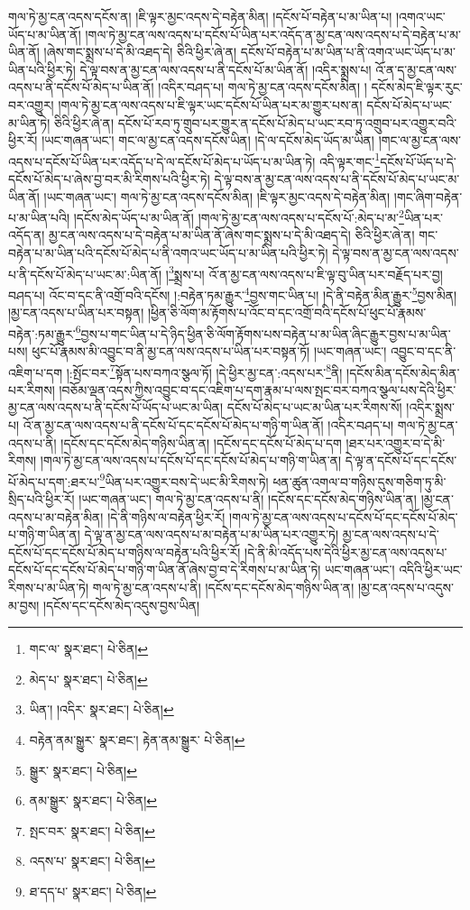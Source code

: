 གལ་ཏེ་མྱ་ངན་འདས་དངོས་ན། །ཇི་ལྟར་མྱང་འདས་དེ་བརྟེན་མིན། །དངོས་པོ་བརྟེན་པ་མ་ཡིན་པ། །འགའ་ཡང་ཡོད་པ་མ་ཡིན་ནོ། །གལ་ཏེ་མྱ་ངན་ལས་འདས་པ་དངོས་པོ་ཡིན་པར་འདོད་ན་མྱ་ངན་ལས་འདས་པ་དེ་བརྟེན་པ་མ་ཡིན་ནོ། །ཞེས་གང་སྨྲས་པ་དེ་མི་འཐད་དེ། ཅིའི་ཕྱིར་ཞེ་ན། དངོས་པོ་བརྟེན་པ་མ་ཡིན་པ་ནི་འགའ་ཡང་ཡོད་པ་མ་ཡིན་པའི་ཕྱིར་ཏེ། དེ་ལྟ་བས་ན་མྱ་ངན་ལས་འདས་པ་ནི་དངོས་པོ་མ་ཡིན་ནོ། །འདིར་སྨྲས་པ། འོ་ན་ད་མྱ་ངན་ལས་འདས་པ་ནི་དངོས་པོ་མེད་པ་ཡིན་ནོ། །འདིར་བཤད་པ། གལ་ཏེ་མྱ་ངན་འདས་དངོས་མིན། །
དངོས་མེད་ཇི་ལྟར་རུང་བར་འགྱུར། །གལ་ཏེ་མྱ་ངན་ལས་འདས་པ་ཇི་ལྟར་ཡང་དངོས་པོ་ཡིན་པར་མ་གྱུར་པས་ན། དངོས་པོ་མེད་པ་ཡང་མ་ཡིན་ཏེ། ཅིའི་ཕྱིར་ཞེ་ན། དངོས་པོ་རབ་ཏུ་གྲུབ་པར་གྱུར་ན་དངོས་པོ་མེད་པ་ཡང་རབ་ཏུ་འགྲུབ་པར་འགྱུར་བའི་ཕྱིར་རོ། །ཡང་གཞན་ཡང་། གང་ལ་མྱ་ངན་འདས་དངོས་ཡིན། །དེ་ལ་དངོས་མེད་ཡོད་མ་ཡིན། །གང་ལ་མྱ་ངན་ལས་འདས་པ་དངོས་པོ་ཡིན་པར་འདོད་པ་དེ་ལ་དངོས་པོ་མེད་པ་ཡོད་པ་མ་ཡིན་ཏེ། འདི་ལྟར་གང་\footnote{གང་ལ་  སྣར་ཐང་།  པེ་ཅིན། }དངོས་པོ་ཡོད་པ་དེ་དངོས་པོ་མེད་པ་ཞེས་བྱ་བར་མི་རིགས་པའི་ཕྱིར་ཏེ། དེ་ལྟ་བས་ན་མྱ་ངན་ལས་འདས་པ་ནི་དངོས་པོ་མེད་པ་ཡང་མ་ཡིན་ནོ། །ཡང་གཞན་ཡང་། གལ་ཏེ་མྱ་ངན་འདས་དངོས་མིན། །ཇི་ལྟར་མྱང་འདས་དེ་བརྟེན་མིན། །གང་ཞིག་བརྟེན་པ་མ་ཡིན་པའི། །དངོས་མེད་ཡོད་པ་མ་ཡིན་ནོ། །གལ་ཏེ་མྱ་ངན་ལས་འདས་པ་དངོས་པོ་:མེད་པ་མ་\footnote{མེད་པ་  སྣར་ཐང་།  པེ་ཅིན། }ཡིན་པར་འདོད་ན། མྱ་ངན་ལས་འདས་པ་དེ་བརྟེན་པ་མ་ཡིན་ནོ་ཞེས་གང་སྨྲས་པ་དེ་མི་འཐད་དེ། ཅིའི་ཕྱིར་ཞེ་ན། གང་བརྟེན་པ་མ་ཡིན་པའི་དངོས་པོ་མེད་པ་ནི་འགའ་ཡང་ཡོད་པ་མ་ཡིན་པའི་ཕྱིར་ཏེ། དེ་ལྟ་བས་ན་མྱ་ངན་ལས་འདས་པ་ནི་དངོས་པོ་མེད་པ་ཡང་མ་:ཡིན་ནོ། །\footnote{ཡིན་། །འདིར་  སྣར་ཐང་།  པེ་ཅིན། }སྨྲས་པ། འོ་ན་མྱ་ངན་ལས་འདས་པ་ཇི་ལྟ་བུ་ཡིན་པར་བརྗོད་པར་བྱ། བཤད་པ། འོང་བ་དང་ནི་འགྲོ་བའི་དངོས། །:བརྟེན་ཏམ་རྒྱུར་\footnote{བརྟེན་ནམ་སྒྱུར་  སྣར་ཐང་། རྟེན་ནམ་སྒྱུར་  པེ་ཅིན། }བྱས་གང་ཡིན་པ། །དེ་ནི་བརྟེན་མིན་རྒྱུར་\footnote{སྒྱུར་  སྣར་ཐང་།  པེ་ཅིན། }བྱས་མིན། །མྱ་ངན་འདས་པ་ཡིན་པར་བསྟན། །ཕྱིན་ཅི་ལོག་མ་རྟོགས་པ་འོང་བ་དང་འགྲོ་བའི་དངོས་པོ་ཕུང་པོ་རྣམས་བརྟེན་:ཏམ་རྒྱུར་\footnote{ནམ་སྒྱུར་  སྣར་ཐང་།  པེ་ཅིན། }བྱས་པ་གང་ཡིན་པ་དེ་ཉིད་ཕྱིན་ཅི་ལོག་རྟོགས་པས་བརྟེན་པ་མ་ཡིན་ཞིང་རྒྱུར་བྱས་པ་མ་ཡིན་པས། ཕུང་པོ་རྣམས་མི་འབྱུང་བ་ནི་མྱ་ངན་ལས་འདས་པ་ཡིན་པར་བསྟན་ཏོ། །ཡང་གཞན་ཡང་། འབྱུང་བ་དང་ནི་འཇིག་པ་དག །:སྤོང་བར་\footnote{སྤང་བར་  སྣར་ཐང་།  པེ་ཅིན། }སྟོན་པས་བཀའ་སྩལ་ཏོ། །དེ་ཕྱིར་མྱ་ངན་:འདས་པར་\footnote{འདས་པ་  སྣར་ཐང་།  པེ་ཅིན། }ནི། །དངོས་མིན་དངོས་མེད་མིན་པར་རིགས། །བཅོམ་ལྡན་འདས་ཀྱིས་འབྱུང་བ་དང་འཇིག་པ་དག་རྣམ་པ་ལས་སྤང་བར་བཀའ་སྩལ་པས་དེའི་ཕྱིར་མྱ་ངན་ལས་འདས་པ་ནི་དངོས་པོ་ཡོད་པ་ཡང་མ་ཡིན། དངོས་པོ་མེད་པ་ཡང་མ་ཡིན་པར་རིགས་སོ། །འདིར་སྨྲས་པ། འོ་ན་མྱ་ངན་ལས་འདས་པ་ནི་དངོས་པོ་དང་དངོས་པོ་མེད་པ་གཉི་ག་ཡིན་ནོ། །འདིར་བཤད་པ། གལ་ཏེ་མྱ་ངན་འདས་པ་ནི། །དངོས་དང་དངོས་མེད་གཉིས་ཡིན་ན། །དངོས་དང་དངོས་པོ་མེད་པ་དག །ཐར་པར་འགྱུར་བ་དེ་མི་རིགས། །གལ་ཏེ་མྱ་ངན་ལས་འདས་པ་དངོས་པོ་དང་དངོས་པོ་མེད་པ་གཉི་ག་ཡིན་ན། དེ་ལྟ་ན་དངོས་པོ་དང་དངོས་པོ་མེད་པ་དག་:ཐར་པ་\footnote{ཐ་དད་པ་  སྣར་ཐང་།  པེ་ཅིན། }ཡིན་པར་འགྱུར་བས་དེ་ཡང་མི་རིགས་ཏེ། ཕན་ཚུན་འགལ་བ་གཉིས་དུས་གཅིག་ཏུ་མི་སྲིད་པའི་ཕྱིར་རོ། །ཡང་གཞན་ཡང་། གལ་ཏེ་མྱ་ངན་འདས་པ་ནི། །དངོས་དང་དངོས་མེད་གཉིས་ཡིན་ན། །མྱ་ངན་འདས་པ་མ་བརྟེན་མིན། །དེ་ནི་གཉིས་ལ་བརྟེན་ཕྱིར་རོ། །གལ་ཏེ་མྱ་ངན་ལས་འདས་པ་དངོས་པོ་དང་དངོས་པོ་མེད་པ་གཉི་ག་ཡིན་ན། དེ་ལྟ་ན་མྱ་ངན་ལས་འདས་པ་མ་བརྟེན་པ་མ་ཡིན་པར་འགྱུར་ཏེ། མྱ་ངན་ལས་འདས་པ་དེ་དངོས་པོ་དང་དངོས་པོ་མེད་པ་གཉིས་ལ་བརྟེན་པའི་ཕྱིར་རོ། །དེ་ནི་མི་འདོད་པས་དེའི་ཕྱིར་མྱ་ངན་ལས་འདས་པ་དངོས་པོ་དང་དངོས་པོ་མེད་པ་གཉི་ག་ཡིན་ནོ་ཞེས་བྱ་བ་དེ་རིགས་པ་མ་ཡིན་ཏེ། ཡང་གཞན་ཡང་། འདིའི་ཕྱིར་ཡང་རིགས་པ་མ་ཡིན་ཏེ། གལ་ཏེ་མྱ་ངན་འདས་པ་ནི། །དངོས་དང་དངོས་མེད་གཉིས་ཡིན་ན། །མྱ་ངན་འདས་པ་འདུས་མ་བྱས། །དངོས་དང་དངོས་མེད་འདུས་བྱས་ཡིན། 